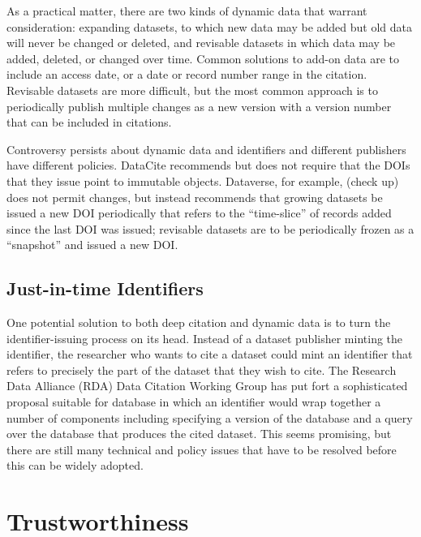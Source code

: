 \documentclass[10pt,a4paper,twocolumn]{article}
\begin{document}
As a practical matter, there are two kinds of dynamic data that warrant consideration: expanding datasets, to which new data may be added but old data will never be changed or deleted, and revisable datasets in which data may be added, deleted, or changed over time. 
Common solutions to add-on data are to include an access date, or a date or record number range in the citation. 
Revisable datasets are more difficult, but the most common approach is to periodically publish multiple changes as a new version with a version number that can be included in citations.

Controversy persists about dynamic data and identifiers and different publishers have different policies. 
DataCite recommends but does not require that the DOIs that they issue point to immutable objects. 
Dataverse, for example, (check up) does not permit changes, but instead recommends that growing datasets be issued a new DOI periodically that refers to the ``time-slice'' of records added since the last DOI was issued; revisable datasets are to be periodically frozen as a ``snapshot'' and issued a new DOI.

\subsection*{Just-in-time Identifiers}\label{just-in-time-identifiers}

One potential solution to both deep citation and dynamic data is to turn the identifier-issuing process on its head. 
Instead of a dataset publisher minting the identifier, the researcher who wants to cite a dataset could mint an identifier that refers to precisely the part of the dataset that they wish to cite. 
The Research Data Alliance (RDA) Data Citation Working Group has put fort a sophisticated proposal suitable for database in which an identifier would wrap together a number of components including specifying a version of the database and a query over the database that produces the cited dataset. 
This seems promising, but there are still many technical and policy issues that have to be resolved before this can be widely adopted.

\section*{Trustworthiness}\label{trustworthiness}

\end{document}
